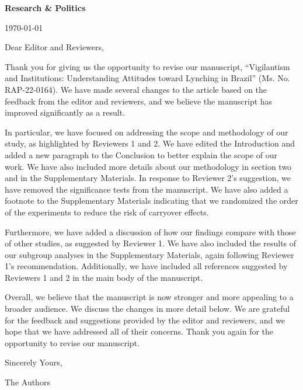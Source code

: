 \documentclass[a4paper,12pt]{article}
\begin{document}
\doublespacing

\noindent \textbf{Research \& Politics}

\noindent \today 

\vspace{.5cm}

\noindent Dear Editor and Reviewers,

\vspace{.5cm}

Thank you for giving us the opportunity to revise our manuscript, ``Vigilantism
and Institutions: Understanding Attitudes toward Lynching in Brazil'' (Ms. No.
RAP-22-0164). We have made several changes to the article based on the feedback
from the editor and reviewers, and we believe the manuscript has improved
significantly as a result.

In particular, we have focused on addressing the scope and methodology of our
study, as highlighted by Reviewers 1 and 2. We have edited the Introduction and
added a new paragraph to the Conclusion to better explain the scope of our
work. We have also included more details about our methodology in section two
and in the Supplementary Materials. In response to Reviewer 2's suggestion, we
have removed the significance tests from the manuscript. We have also added a
footnote to the Supplementary Materials indicating that we randomized the order
of the experiments to reduce the risk of carryover effects.

Furthermore, we have added a discussion of how our findings compare with those
of other studies, as suggested by Reviewer 1. We have also included the results
of our subgroup analyses in the Supplementary Materials, again following
Reviewer 1's recommendation. Additionally, we have included all references
suggested by Reviewers 1 and 2 in the main body of the manuscript.

Overall, we believe that the manuscript is now stronger and more appealing to a
broader audience. We discuss the changes in more detail below. We are grateful
for the feedback and suggestions provided by the editor and reviewers, and we
hope that we have addressed all of their concerns. Thank you again for the
opportunity to revise our manuscript.

\vspace{.5cm}

\noindent Sincerely Yours,

\vspace{.5cm}

\noindent The Authors
\end{document}
